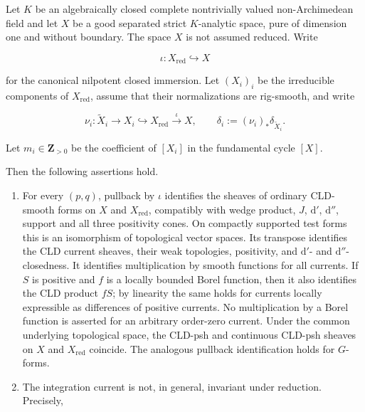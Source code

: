 
\begin{proposition}
\label{prop:p21p3-curve-rigidity-nonreduced}
Let \(K\) be an algebraically closed complete nontrivially valued
non-Archimedean field and let \(X\) be a good separated strict
\(K\)-analytic space, pure of dimension one and without boundary.  The
space \(X\) is not assumed reduced.  Write

\[
             \iota:X_{\mathrm{red}}\hookrightarrow X
\]

for the canonical nilpotent closed immersion.  Let \((X_i)_i\) be the
irreducible components of \(X_{\mathrm{red}}\), assume that their
normalizations are rig-smooth, and write

\[
 \nu_i:\widetilde X_i\longrightarrow X_i
       \hookrightarrow X_{\mathrm{red}}\xrightarrow{\iota}X,
 \qquad
 \delta_i:=(\nu_i)_*\delta_{\widetilde X_i}.
\]

Let \(m_i\in\mathbf Z_{>0}\) be the coefficient of \([X_i]\) in the
fundamental cycle \([X]\).

Then the following assertions hold.

\begin{enumerate}
\item\label{itm:p21p3-nr:calculus}
For every \((p,q)\), pullback by \(\iota\) identifies the sheaves of
ordinary CLD-smooth forms on \(X\) and \(X_{\mathrm{red}}\), compatibly
with wedge product, \(J\), \(\mathrm d'\), \(\mathrm d''\), support and all
three positivity cones.  On compactly supported test forms this is an
isomorphism of topological vector spaces.  Its transpose identifies the
CLD current sheaves, their weak topologies, positivity, and
\(\mathrm d'\)- and \(\mathrm d''\)-closedness.  It identifies
multiplication by smooth functions for all currents.  If \(S\) is positive
and \(f\) is a locally bounded Borel function, then it also identifies the
CLD product \(fS\); by linearity the same holds for currents locally
expressible as differences of positive currents.  No multiplication by a
Borel function is asserted for an arbitrary order-zero current.  Under the
common underlying topological space, the CLD-psh and continuous CLD-psh
sheaves on \(X\) and \(X_{\mathrm{red}}\) coincide.  The analogous pullback
identification holds for \(G\)-forms.

\item\label{itm:p21p3-nr:integration}
The integration current is not, in general, invariant under reduction.
Precisely,


\end{enumerate}
\end{proposition}
